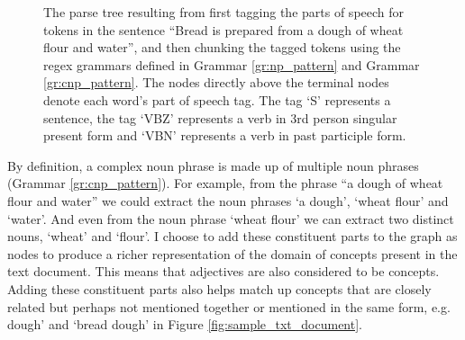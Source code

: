\documentclass[12pt]{article}
\theoremstyle{grammarstyle}
\begin{document}
\begin{figure}[t]
    \centering
    \caption{The parse tree resulting from first tagging the parts of speech for tokens in the sentence ``Bread is prepared from a dough of wheat flour and water'', and then chunking the tagged tokens using the regex grammars defined in Grammar \ref{gr:np_pattern} and Grammar \ref{gr:cnp_pattern}. The nodes directly above the terminal nodes denote each word's part of speech tag. The tag `S' represents a sentence, the tag `VBZ' represents a verb in 3rd person singular present form and `VBN' represents a verb in past participle form.}
    \label{fig:parse_tree_example}
\end{figure}

By definition, a complex noun phrase is made up of multiple noun phrases (Grammar \ref{gr:cnp_pattern}). For example, from the phrase ``a dough of wheat flour and water'' we could extract the noun phrases `a dough', `wheat flour' and `water'. And even from the noun phrase `wheat flour' we can extract two distinct nouns, `wheat' and `flour'. I choose to add these constituent parts to the graph as nodes to produce a richer representation of the domain of concepts present in the text document. This means that adjectives are also considered to be concepts. Adding these constituent parts also helps match up concepts that are closely related but perhaps not mentioned together or mentioned in the same form, e.g. dough' and `bread dough' in Figure \ref{fig:sample_txt_document}.
\end{document}

